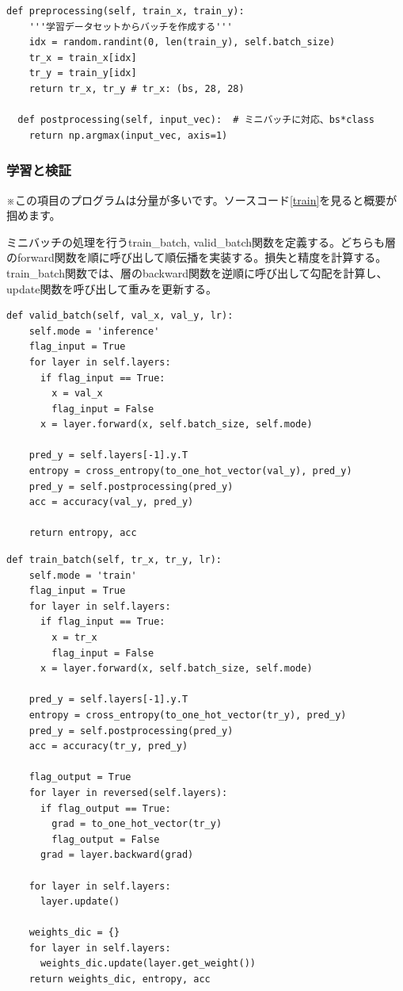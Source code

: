 \documentclass[platex,dvipdfmx]{jsarticle}
\begin{document}
\begin{lstlisting}[caption=ex\_advanced.py, label=preprocessing]
  def preprocessing(self, train_x, train_y):
    '''学習データセットからバッチを作成する'''
    idx = random.randint(0, len(train_y), self.batch_size)
    tr_x = train_x[idx]
    tr_y = train_y[idx]
    return tr_x, tr_y # tr_x: (bs, 28, 28)

  def postprocessing(self, input_vec):  # ミニバッチに対応、bs*class
    return np.argmax(input_vec, axis=1)
\end{lstlisting}

\subsubsection{学習と検証}

※この項目のプログラムは分量が多いです。ソースコード\ref{train}を見ると概要が掴めます。

ミニバッチの処理を行うtrain\_batch, valid\_batch関数を定義する。どちらも層のforward関数を順に呼び出して順伝播を実装する。損失と精度を計算する。train\_batch関数では、層のbackward関数を逆順に呼び出して勾配を計算し、update関数を呼び出して重みを更新する。

\begin{lstlisting}[caption=ex\_advanced.py, label=validBbatch]
  def valid_batch(self, val_x, val_y, lr):
    self.mode = 'inference'
    flag_input = True
    for layer in self.layers:
      if flag_input == True:
        x = val_x
        flag_input = False
      x = layer.forward(x, self.batch_size, self.mode)

    pred_y = self.layers[-1].y.T
    entropy = cross_entropy(to_one_hot_vector(val_y), pred_y)
    pred_y = self.postprocessing(pred_y)
    acc = accuracy(val_y, pred_y)

    return entropy, acc
\end{lstlisting}

\begin{lstlisting}[caption=ex\_advanced.py, label=trainBatch]
  def train_batch(self, tr_x, tr_y, lr):
    self.mode = 'train'
    flag_input = True
    for layer in self.layers:
      if flag_input == True:
        x = tr_x
        flag_input = False
      x = layer.forward(x, self.batch_size, self.mode)

    pred_y = self.layers[-1].y.T
    entropy = cross_entropy(to_one_hot_vector(tr_y), pred_y)
    pred_y = self.postprocessing(pred_y)
    acc = accuracy(tr_y, pred_y)

    flag_output = True
    for layer in reversed(self.layers):
      if flag_output == True:
        grad = to_one_hot_vector(tr_y)
        flag_output = False
      grad = layer.backward(grad)

    for layer in self.layers:
      layer.update()

    weights_dic = {}
    for layer in self.layers:
      weights_dic.update(layer.get_weight())
    return weights_dic, entropy, acc
\end{lstlisting}
\end{document}
